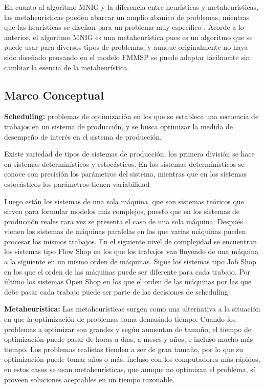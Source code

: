 \documentclass{article}
\begin{document}
\vspace{\baselineskip}
En cuanto al algoritmo MNIG y la diferencia entre heurísticas y metaheurísticas, las metaheurísticas pueden abarcar un amplio abanico de problemas, mientras que las heurísticas se diseñan para un problema muy específico \autocite{metaTalbi}. Acorde a lo anterior, el algoritmo MNIG es una metaheurística pues es un algoritmo que se puede usar para diversos tipos de problemas, y aunque originalmente no haya sido diseñado pensando en el modelo FMMSP se puede adaptar fácilmente sin cambiar la esencia de la metaheurística.

\subsection{Marco Conceptual}

\indent\indent
\textbf{Scheduling:} problemas de optimización en los que se establece una secuencia de trabajos en un sistema de producción, y se busca optimizar la medida de desempeño de interés en el sistema de producción.

\vspace{\baselineskip}
Existe variedad de tipos de sistemas de producción, los primera división se hace en sistemas determinísticos y estocásticos. En los sistemas determinísticos se conoce con precisión los parámetros del sistema, mientras que en los sistemas estocásticos los parámetros tienen variabilidad \autocite{schedPinedo}

\vspace{\baselineskip}
Luego están los sistemas de una sola máquina, que son sistemas teóricos que sirven para formular modelos más complejos, puesto que en los sistemas de producción reales rara vez se presenta el caso de una sola máquina. Después vienen los sistemas de máquinas paralelas en los que varias máquinas pueden procesar los mismos trabajos. En el siguiente nivel de complejidad se encuentran los sistemas tipo Flow Shop en los que los trabajos van fluyendo de una máquina a la siguiente en un mismo orden de máquinas. Sigue los sistemas tipo Job Shop en los que el orden de las máquinas puede ser diferente para cada trabajo. Por último los sistemas Open Shop en los que el orden de las máquinas por las que debe pasar cada trabajo puede ser parte de las decisiones de scheduling. \autocite{schedPinedo}

\vspace{\baselineskip}
\textbf{Metaheurística:} Las metaheurísticas surgen como una alternativa a la \linebreak situación en que la optimización de problemas toma demasiado tiempo. Cuando los problemas a optimizar son grandes y según aumentan de tamaño, el tiempo de optimización puede pasar de horas a días, a meses y años, e incluso mucho más tiempo. Los problemas realistas tienden a ser de gran tamaño, por lo que su optimización puede tomar años o más, incluso con los computadores más rápidos, en estos casos se usan metaheurísticas, que aunque no optimizan el problema, sí proveen soluciones aceptables en un tiempo razonable. \autocite{metaTalbi}
\end{document}
